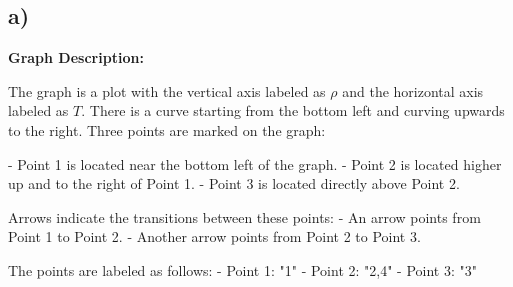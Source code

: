 

\subsection*{a)}

\begin{center}
\textbf{Graph Description:}

The graph is a plot with the vertical axis labeled as $\rho$ and the horizontal axis labeled as $T$. There is a curve starting from the bottom left and curving upwards to the right. Three points are marked on the graph:

- Point 1 is located near the bottom left of the graph.
- Point 2 is located higher up and to the right of Point 1.
- Point 3 is located directly above Point 2.

Arrows indicate the transitions between these points:
- An arrow points from Point 1 to Point 2.
- Another arrow points from Point 2 to Point 3.

The points are labeled as follows:
- Point 1: "1"
- Point 2: "2,4"
- Point 3: "3"
\end{center}